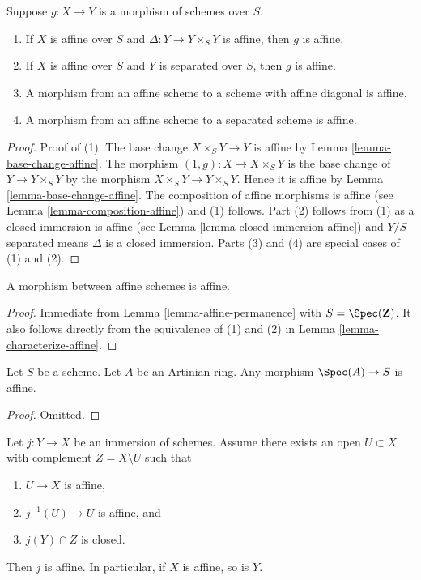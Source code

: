 \begin{lemma}
\label{lemma-affine-permanence}
Suppose $g : X \to Y$ is a morphism of schemes over $S$.
\begin{enumerate}
\item If $X$ is affine over $S$ and $\Delta : Y \to Y \times_S Y$ is affine,
then $g$ is affine.
\item If $X$ is affine over $S$ and $Y$ is separated over $S$,
then $g$ is affine.
\item A morphism from an affine scheme to a scheme with affine
diagonal is affine.
\item A morphism from an affine scheme to a separated scheme is affine.
\end{enumerate}
\end{lemma}

\begin{proof}
Proof of (1). The base change $X \times_S Y \to Y$ is affine by
Lemma \ref{lemma-base-change-affine}.
The morphism $(1, g) : X \to X \times_S Y$ is the base change of
$Y \to Y \times_S Y$ by the morphism $X \times_S Y \to Y \times_S Y$.
Hence it is affine by
Lemma \ref{lemma-base-change-affine}.
The composition of affine morphisms is affine
(see Lemma \ref{lemma-composition-affine}) and (1) follows.
Part (2) follows from (1) as a closed immersion is affine
(see Lemma \ref{lemma-closed-immersion-affine}) and $Y/S$ separated
means $\Delta$ is a closed immersion. Parts (3) and (4) are special
cases of (1) and (2).
\end{proof}

\begin{lemma}
\label{lemma-morphism-affines-affine}
A morphism between affine schemes is affine.
\end{lemma}

\begin{proof}
Immediate from Lemma \ref{lemma-affine-permanence} with
$S = \Spec(\mathbf{Z})$. It also follows directly from the
equivalence of (1) and (2) in Lemma \ref{lemma-characterize-affine}.
\end{proof}

\begin{lemma}
\label{lemma-Artinian-affine}
Let $S$ be a scheme.
Let $A$ be an Artinian ring.
Any morphism $\Spec(A) \to S$ is affine.
\end{lemma}

\begin{proof}
Omitted.
\end{proof}

\begin{lemma}
\label{lemma-get-affine}
Let $j : Y \to X$ be an immersion of schemes.
Assume there exists an open $U \subset X$ with complement
$Z = X \setminus U$ such that
\begin{enumerate}
\item $U \to X$ is affine,
\item $j^{-1}(U) \to U$ is affine, and
\item $j(Y) \cap Z$ is closed.
\end{enumerate}
Then $j$ is affine. In particular, if $X$ is affine, so is $Y$.
\end{lemma}

